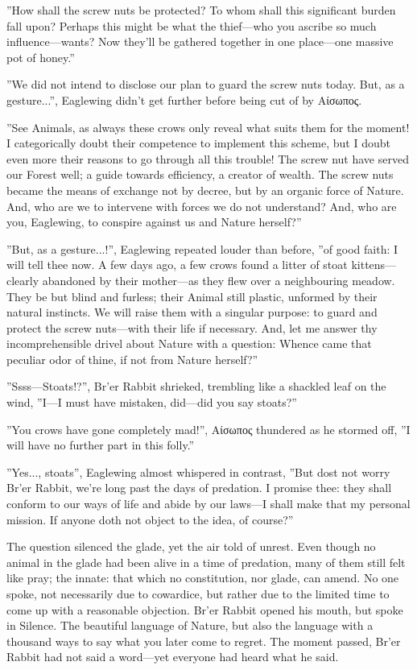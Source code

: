 ”How shall the screw nuts be protected? To whom shall this significant burden fall upon? Perhaps this might be what the thief---who you ascribe so much influence---wants? Now they'll be gathered together in one place---one massive pot of honey.”

”We did not intend to disclose our plan to guard the screw nuts today. But, as a gesture...”, Eaglewing didn't get further before being cut of by Αίσωπος. 

”See Animals, as always these crows only reveal what suits them for the moment! I categorically doubt their competence to implement this scheme, but I doubt even more their reasons to go through all this trouble! The screw nut have served our Forest well; a guide towards efficiency, a creator of wealth. The screw nuts became the means of exchange not by decree, but by an organic force of Nature. And, who are we to intervene with forces we do not understand? And, who are you, Eaglewing, to conspire against us and Nature herself?”

”But, as a gesture...!”, Eaglewing repeated louder than before, ”of good faith: I will tell thee now. A few days ago, a few crows found a litter of stoat kittens---clearly abandoned by their mother---as they flew over a neighbouring meadow. They be but blind and furless; their Animal still plastic, unformed by their natural instincts. We will raise them with a singular purpose: to guard and protect the screw nuts---with
their life if necessary. And, let me answer thy incomprehensible drivel about Nature with a question: Whence came that peculiar odor of thine, if not from Nature herself?”

”Ssss---Stoats!?”, Br'er Rabbit shrieked, trembling like a shackled leaf on the wind, ”I---I must have mistaken, did---did you say stoats?”

”You crows have gone completely mad!”, Αίσωπος thundered as he stormed off, ”I will have no further part in this folly.”

”Yes..., stoats”, Eaglewing almost whispered in contrast, ”But dost not worry Br'er Rabbit, we're long past the days of predation. I promise thee: they shall conform to our ways of life and abide by our laws---I shall make that my personal mission. If anyone doth not object to the idea, of course?”

The question silenced the glade, yet the air told of unrest. Even though no animal in the glade had been alive in a time of predation, many of them still felt like pray; the innate: that which no constitution, nor glade, can amend. No one spoke, not necessarily due to cowardice, but rather due to the limited time to come up with a reasonable objection. Br'er Rabbit opened his mouth, but spoke in Silence. The beautiful language of Nature, but also the language with a
thousand ways to say what you later come to regret. The moment passed, Br'er Rabbit had not said a word---yet everyone had heard what he said.

